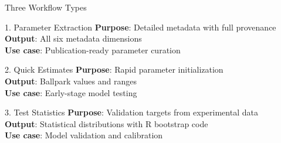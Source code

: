 \documentclass[10pt]{beamer}
\begin{document}
\begin{frame}{Three Workflow Types}

  \begin{block}{1. Parameter Extraction}
    \textbf{Purpose}: Detailed metadata with full provenance\\
    \textbf{Output}: All six metadata dimensions\\
    \textbf{Use case}: Publication-ready parameter curation
  \end{block}

  \vspace{0.2cm}

  \begin{block}{2. Quick Estimates}
    \textbf{Purpose}: Rapid parameter initialization\\
    \textbf{Output}: Ballpark values and ranges\\
    \textbf{Use case}: Early-stage model testing
  \end{block}

  \vspace{0.2cm}

  \begin{block}{3. Test Statistics}
    \textbf{Purpose}: Validation targets from experimental data\\
    \textbf{Output}: Statistical distributions with R bootstrap code\\
    \textbf{Use case}: Model validation and calibration
  \end{block}

\end{frame}
\end{document}
